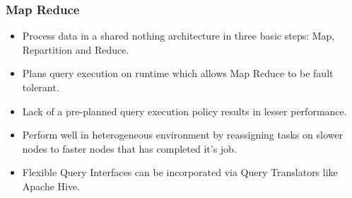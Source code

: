 \documentclass{beamer}
\begin{document}
\begin{frame}
  \frametitle{Map Reduce}
  \begin{itemize}
  \item Process data in a shared nothing architecture in three basic
    steps: Map, Repartition and Reduce.
  \item Plans query execution on runtime which allows Map Reduce to be
    fault tolerant.
  \item Lack of a pre-planned query execution policy results in lesser
    performance.
  \item Perform well in heterogeneous environment by reassigning tasks
    on slower nodes to faster nodes that has completed it’s job.
  \item Flexible Query Interfaces can be incorporated via Query Translators like Apache Hive.
  \end{itemize}
\end{frame}




\end{document}
